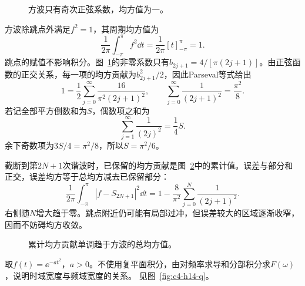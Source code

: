 \begin{figure}[H]\centering
{}
\caption{方波只有奇次正弦系数，均方值为一。}\label{fig:c4-h13-q}
\end{figure}
\begin{solution}
方波除跳点外满足$f^2=1$，其周期均方值为
\[\frac1{2\pi}\int_{-\pi}^{\pi}f^2\dd t
=\frac1{2\pi}[t]_{-\pi}^\pi=1.\]
跳点的赋值不影响积分。图~\ref{fig:c4-h13-q}的非零系数只有$b_{2j+1}=4/[\pi(2j+1)]$。由正弦函数的正交关系，每一项的均方贡献为$b_{2j+1}^2/2$，因此Parseval等式给出
\[1=\frac12\sum_{j=0}^\infty\frac{16}{\pi^2(2j+1)^2},\qquad
\boxed{\sum_{j=0}^\infty\frac1{(2j+1)^2}=\frac{\pi^2}{8}}.\]
若记全部平方倒数和为$S$，偶数项之和为
\[\sum_{j=1}^\infty\frac1{(2j)^2}=\frac14S.\]
余下奇数项为$3S/4=\pi^2/8$，所以$\boxed{S=\pi^2/6}$。

截断到第$2N+1$次谐波时，已保留的均方贡献是图~\ref{fig:c4-h13-s}中的累计值。误差与部分和正交，误差均方等于总均方减去已保留部分：
\[\frac1{2\pi}\int_{-\pi}^{\pi}|f-S_{2N+1}|^2\dd t
=1-\frac8{\pi^2}\sum_{j=0}^N\frac1{(2j+1)^2}.\]
右侧随$N$增大趋于零。跳点附近仍可能有局部过冲，但误差较大的区域逐渐收窄，因而不妨碍均方收敛。

\begin{figure}[H]\centering
{}
\caption{累计均方贡献单调趋于方波的总均方值。}\label{fig:c4-h13-s}
\end{figure}
\end{solution}

\begin{exercise}[高斯函数的傅里叶变换]\label{ex:c4-h14}
取$f(t)=\ee^{-at^2}$，$a>0$。不使用复平面积分，由对频率求导和分部积分求$F(\omega)$，说明时域宽度与频域宽度的关系。 见图~\ref{fig:c4-h14-q}。
\end{exercise}

